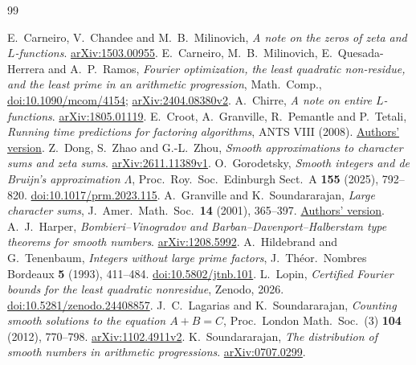 \documentclass[11pt]{article}
\begin{document}
\small
\begin{thebibliography}{99}
\raggedright
\setlength{\itemsep}{2pt}
\setlength{\parskip}{0pt}
 E.~Carneiro, V.~Chandee and M.~B.~Milinovich,
\emph{A note on the zeros of zeta and \(L\)-functions}.
\href{https://arxiv.org/pdf/1503.00955}{arXiv:1503.00955}.
 E.~Carneiro, M.~B.~Milinovich, E.~Quesada-Herrera and
A.~P.~Ramos, \emph{Fourier optimization, the least quadratic non-residue,
and the least prime in an arithmetic progression}, Math.\ Comp.,
\href{https://doi.org/10.1090/mcom/4154}{doi:10.1090/mcom/4154};
\href{https://arxiv.org/pdf/2404.08380v2}{arXiv:2404.08380v2}.
 A.~Chirre, \emph{A note on entire \(L\)-functions}.
\href{https://arxiv.org/pdf/1805.01119}{arXiv:1805.01119}.
 E.~Croot, A.~Granville, R.~Pemantle and P.~Tetali,
\emph{Running time predictions for factoring algorithms}, ANTS VIII
(2008). \href{https://www2.math.upenn.edu/~pemantle/papers/square-algorithms.pdf}{Authors' version}.
 Z.~Dong, S.~Zhao and G.-L.~Zhou,
\emph{Smooth approximations to character sums and zeta sums}.
\href{https://arxiv.org/pdf/2611.11389v1}{arXiv:2611.11389v1}.
 O.~Gorodetsky, \emph{Smooth integers and de Bruijn's
approximation \(\Lambda\)}, Proc.\ Roy.\ Soc.\ Edinburgh Sect.~A
\textbf{155} (2025), 792--820.
\href{https://doi.org/10.1017/prm.2023.115}{doi:10.1017/prm.2023.115}.
 A.~Granville and K.~Soundararajan, \emph{Large character
sums}, J.~Amer.\ Math.\ Soc.\ \textbf{14} (2001), 365--397.
\href{https://dms.umontreal.ca/~andrew/PDF/ChiSums.pdf}{Authors' version}.
 A.~J.~Harper, \emph{Bombieri--Vinogradov and
Barban--Davenport--Halberstam type theorems for smooth numbers}.
\href{https://arxiv.org/pdf/1208.5992}{arXiv:1208.5992}.
 A.~Hildebrand and G.~Tenenbaum, \emph{Integers without
large prime factors}, J.~Th\'eor.\ Nombres Bordeaux \textbf{5} (1993),
411--484. \href{https://doi.org/10.5802/jtnb.101}{doi:10.5802/jtnb.101}.
 L.~Lopin, \emph{Certified Fourier bounds for the least
quadratic nonresidue}, Zenodo, 2026.
\href{https://doi.org/10.5281/zenodo.24408857}{doi:10.5281/zenodo.24408857}.
 J.~C.~Lagarias and K.~Soundararajan, \emph{Counting smooth
solutions to the equation \(A+B=C\)}, Proc.\ London Math.\ Soc.\ (3)
\textbf{104} (2012), 770--798.
\href{https://arxiv.org/pdf/1102.4911v2}{arXiv:1102.4911v2}.
 K.~Soundararajan, \emph{The distribution of smooth
numbers in arithmetic progressions}.
\href{https://arxiv.org/pdf/0707.0299}{arXiv:0707.0299}.
\end{thebibliography}
\end{document}

